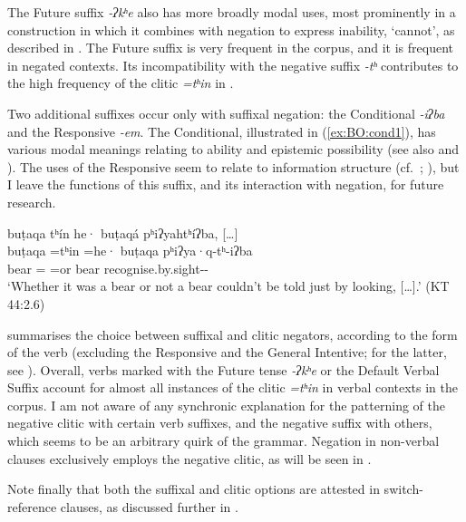 \documentclass[output=paper,modfonts,nonflat,colorlinks,citecolor=brown]{langscibook}
\begin{document}
The Future suffix \textit{-ʔkʰe} also has more broadly modal uses, most prominently in a construction in which it combines with negation to express inability, `cannot', as described in . The Future suffix is very frequent in the corpus, and it is frequent in negated contexts. Its incompatibility with the negative suffix \textit{-tʰ} contributes to the high frequency of the clitic \textit{=tʰin} in .

Two additional suffixes occur only with suffixal negation: the Conditional \mbox{\textit{-iʔba}} and the Responsive \textit{-em}. The Conditional, illustrated in (\ref{ex:BO:cond1}), has various modal meanings relating to ability and epistemic possibility (see also  and ). The uses of the Responsive seem to relate to information structure (cf.\ \citealt[283]{Oswalt1961}; \citealt[32--34]{Olsson2010}), but I leave the functions of this suffix, and its interaction with negation, for future research.

{%
\ea 
\label{ex:BO:cond1}
\glll buṭaqa tʰín he· buṭaqá {pʰiʔyahtʰíʔba, [\ldots]}\\
     buṭaqa =tʰin =he· buṭaqa pʰiʔya·q-tʰ-iʔba\\
     bear = =or bear recognise.by.sight-- \\
\glt `Whether it was a bear or not a bear couldn't be told just by looking, [\ldots].' ({KT 44:2.6})\\
\z
}%

 summarises the choice between suffixal and clitic negators, according to the form of the verb (excluding the Responsive and the General Intentive; for the latter, see ).
Overall, verbs marked with the Future tense \textit{-ʔkʰe} or the Default Verbal Suffix account for almost all instances of the clitic \textit{=tʰin} in verbal contexts in the corpus. I am not aware of any synchronic explanation for the patterning of the negative clitic with certain verb suffixes, and the negative suffix with others, which seems to be an arbitrary quirk of the grammar. Negation in non-verbal clauses exclusively employs the negative clitic, as will be seen in .%

Note finally that both the suffixal and clitic options are attested in switch-reference clauses, as discussed further in .
\end{document}
